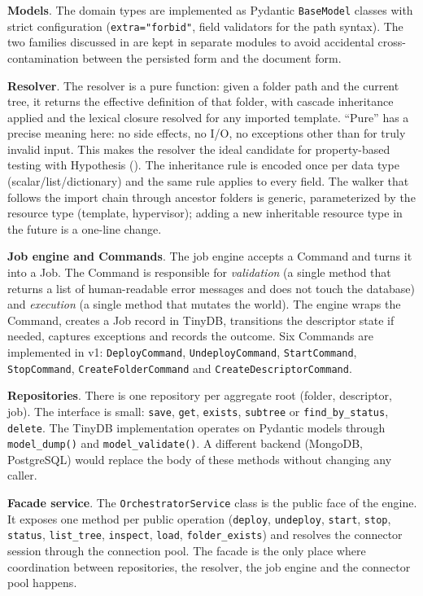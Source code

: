\textbf{Models}. The domain types are implemented as Pydantic
\texttt{BaseModel} classes with strict configuration
(\texttt{extra="forbid"}, field validators for the path syntax). The
two families discussed in  are kept in
separate modules to avoid accidental cross-contamination between
the persisted form and the document form.

\textbf{Resolver}. The resolver is a pure function: given a folder
path and the current tree, it returns the effective definition of
that folder, with cascade inheritance applied and the lexical
closure resolved for any imported template. ``Pure'' has a precise
meaning here: no side effects, no I/O, no exceptions other than for
truly invalid input. This makes the resolver the ideal candidate for
property-based testing with Hypothesis (). The
inheritance rule is encoded once per data type
(scalar/list/dictionary) and the same rule applies to every field.
The walker that follows the import chain through ancestor folders
is generic, parameterized by the resource type (template,
hypervisor); adding a new inheritable resource type in the future is
a one-line change.

\textbf{Job engine and Commands}. The job engine accepts a Command
and turns it into a Job. The Command is responsible for
\emph{validation} (a single method that returns a list of
human-readable error messages and does not touch the database) and
\emph{execution} (a single method that mutates the world). The
engine wraps the Command, creates a Job record in TinyDB,
transitions the descriptor state if needed, captures exceptions and
records the outcome. Six Commands are implemented in v1:
\texttt{DeployCommand}, \texttt{UndeployCommand},
\texttt{StartCommand}, \texttt{StopCommand},
\texttt{CreateFolderCommand} and \texttt{CreateDescriptorCommand}.

\textbf{Repositories}. There is one repository per aggregate root
(folder, descriptor, job). The interface is small: \texttt{save},
\texttt{get}, \texttt{exists}, \texttt{subtree} or \texttt{find\_by\_status},
\texttt{delete}. The TinyDB implementation operates on Pydantic
models through \texttt{model\_dump()} and \texttt{model\_validate()}.
A different backend (MongoDB, PostgreSQL) would replace the body of
these methods without changing any caller.

\textbf{Facade service}. The \texttt{OrchestratorService} class is
the public face of the engine. It exposes one method per public
operation (\texttt{deploy}, \texttt{undeploy}, \texttt{start},
\texttt{stop}, \texttt{status}, \texttt{list\_tree}, \texttt{inspect},
\texttt{load}, \texttt{folder\_exists}) and resolves the connector
session through the connection pool. The facade is the only place
where coordination between repositories, the resolver, the job
engine and the connector pool happens.

